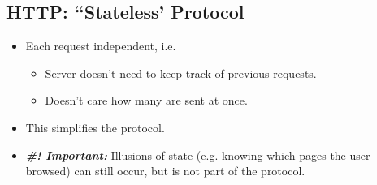 \documentclass[10pt]{article}
\begin{document}
\subsection{HTTP: ``Stateless' Protocol}
\begin{itemize}
    \item Each request independent, i.e.
    \begin{itemize}
        \item Server doesn't need to keep track of previous requests.
        \item Doesn't care how many are sent at once. 
    \end{itemize}
    \item This simplifies the protocol.
    \item \textit{\textbf{\#! Important:}} Illusions of state (e.g. knowing which pages the user browsed) can still occur, but is not part of the protocol. 
\end{itemize}
\end{document}
